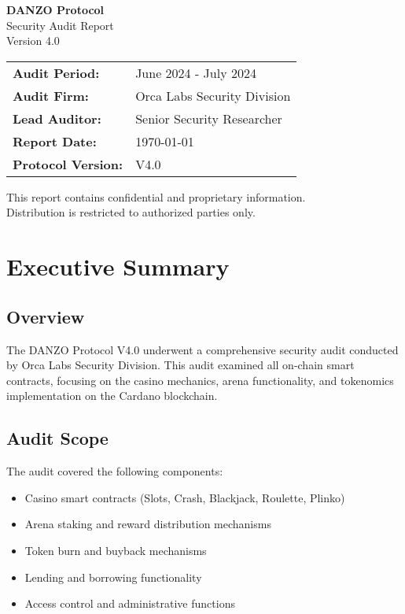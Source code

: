 \documentclass[11pt,a4paper]{article}
\begin{document}
\begin{titlepage}
    \centering
    \vspace*{2cm}
    
    {\Huge\bfseries\color{danzoBlue} DANZO Protocol}\\[0.5cm]
    {\LARGE\color{danzoGray} Security Audit Report}\\[2cm]
    
    {\Large Version 4.0}\\[1cm]
    
    \begin{tabular}{ll}
        \textbf{Audit Period:} & June 2024 - July 2024 \\
        \textbf{Audit Firm:} & Orca Labs Security Division \\
        \textbf{Lead Auditor:} & Senior Security Researcher \\
        \textbf{Report Date:} & \today \\
        \textbf{Protocol Version:} & V4.0 \\
    \end{tabular}
    
    \vfill
    
    {\large\textcolor{danzoGray}{
        This report contains confidential and proprietary information.\\
        Distribution is restricted to authorized parties only.
    }}
    
\end{titlepage}

\tableofcontents
\newpage

\section{Executive Summary}

\subsection{Overview}
The DANZO Protocol V4.0 underwent a comprehensive security audit conducted by Orca Labs Security Division. This audit examined all on-chain smart contracts, focusing on the casino mechanics, arena functionality, and tokenomics implementation on the Cardano blockchain.

\subsection{Audit Scope}
The audit covered the following components:
\begin{itemize}
    \item Casino smart contracts (Slots, Crash, Blackjack, Roulette, Plinko)
    \item Arena staking and reward distribution mechanisms
    \item Token burn and buyback mechanisms
    \item Lending and borrowing functionality
    \item Access control and administrative functions
\end{itemize}
\end{document}
